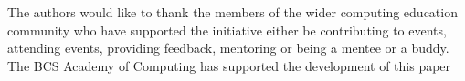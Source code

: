 \documentclass[sigconf]{acmart}
\begin{document}
\begin{acks}
	
	The authors would like to thank the members of the wider computing education community who have supported the initiative either be contributing to events, attending events, providing feedback, mentoring or being a mentee or a buddy.
	The BCS Academy of Computing has supported the development of this paper
	
	
\end{acks}




\end{document}

